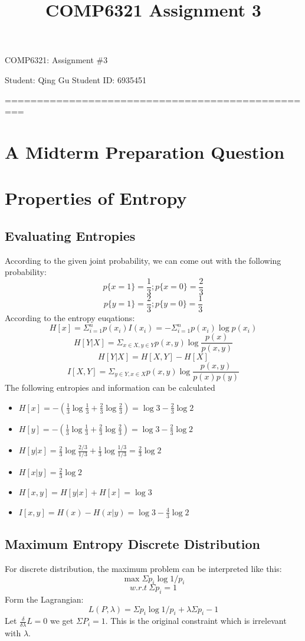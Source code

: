 \documentclass[a4paper, 12pt, titlepage]{article}
\begin{document}
\title{COMP6321 Assignment 3}
\setcounter{tocdepth}{2}
\newpage
\begin{center}
    {\huge COMP6321: Assignment \#3}


    \vspace{2cm}
    Student: Qing Gu  \hspace{5cm}
    Student ID: 6935451
    \vspace{1cm}

    =================================================
\end{center}
\section{A Midterm Preparation Question}
\section{Properties of Entropy}
\subsection{Evaluating Entropies}
According to the given joint probability, we can come out with the following probability:
$$p\{x=1\} = \frac{1}{3}; p\{x=0\} = \frac{2}{3}$$
$$p\{y=1\} = \frac{2}{3}; p\{y=0\} = \frac{1}{3}$$
According to the entropy euqations:
$$ H[x] = \Sigma_{i=1}^np(x_i)I(x_i)=-\Sigma_{i=1}^np(x_i)\log{p(x_i)}$$
$$ H[Y|X] = \Sigma_{x\in{}X, y\in{}Y}p(x,y)\log{\frac{p(x)}{p(x,y)}}$$
$$H[Y|X]=H[X,Y]-H[X]$$
$$I[X,Y] = \Sigma_{y\in{}Y, x\in{}X}p(x,y)\log{\frac{p(x,y)}{p(x)p(y)}}$$
The following entropies and information can be calculated
\begin{itemize}
    \item $H[x] = -(\frac{1}{3}\log{\frac{1}{3}}+\frac{2}{3}\log{\frac{2}{3}})=\log{3}-\frac{2}{3}\log{2}$
    \item $H[y] = -(\frac{1}{3}\log{\frac{1}{3}}+\frac{2}{3}\log{\frac{2}{3}})=\log{3}-\frac{2}{3}\log{2}$
    \item $H[y|x] = \frac{2}{3}\log{\frac{2/3}{1/3}}+\frac{1}{3}\log{\frac{1/3}{1/3}}=\frac{2}{3}\log{2}$
    \item $H[x|y] = \frac{2}{3}\log{2}$
    \item $H[x,y] = H[y|x] + H[x] = \log{3}$
    \item $I[x,y] = H(x) - H(x|y) = \log{3} - \frac{4}{3}\log{2}$
\end{itemize}
\subsection{Maximum Entropy Discrete Distribution}
For discrete distribution, the maximum problem can be interpreted like this:
$$\max{}\Sigma{}p_i\log{1/p_i}$$
$$w.r.t~\Sigma{}p_i=1$$
Form the Lagrangian:
$$L(P, \lambda) = \Sigma{}p_i\log{1/p_i} + \lambda{\Sigma{}p_i-1}$$
Let $\frac{\delta}{\delta\lambda}L=0$ we get $\Sigma{}P_i=1$. This is the original constraint which is irrelevant with $\lambda$.
\end{document}
